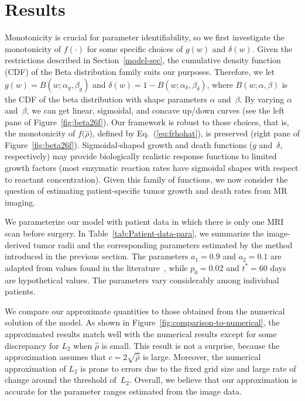 \documentclass{aims}
\numberwithin{equation}{section}
\begin{document}
\section{Results}

Monotonicity is crucial for parameter identifiability, so we
first investigate the monotonicity of $f(\cdot)$ for some specific
choices of $g(w)$ and $\delta(w)$.
Given the restrictions described in Section~\ref{model-sec},
the cumulative density function (CDF) of the Beta distribution family
suits our purposes.  Therefore, we let $g(w)=B(w;\alpha_g,\beta_g)$ and
$\delta(w)=1-B(w;\alpha_{\delta},\beta_{\delta})$, where 
$B(w; \alpha, \beta)$ is the CDF of the beta distribution with shape
parameters $\alpha$ and~$\beta$. By varying $\alpha$ and~$\beta$, we can
get linear, sigmoidal, and concave
up/down curves (see the left pane of Figure~\ref{fig:beta26f}).
Our framework is robust to those choices, that is, the
monotonicity of $f(\hat\rho$), defined by Eq.~(\ref{eq:frhohat}),
is preserved (right pane of Figure~\ref{fig:beta26f}). 
Sigmoidal-shaped growth and death functions ($g$ and~$\delta$, respectively)
may provide biologically realistic response functions to limited growth factors
(most enzymatic reaction rates have sigmoidal
shapes with respect to reactant concentration).  Given this family of
functions, we now consider the question of estimating patient-specific tumor
growth and death rates from MR imaging.

We parameterize our model with patient data in which there is only
one MRI scan before surgery. In Table~\ref{tab:Patient-data-para},
we summarize the image-derived tumor radii and the corresponding parameters
estimated by the method introduced in the previous section.
The parameters $a_1=0.9$ and $a_2=0.1$ are adapted from values found in the
literature~\cite{Swanson2008}, while $p_0=0.02$  and $t^*=60$ days
are hypothetical values.  The parameters vary considerably
among individual patients. 

We compare our approximate quantities to those obtained from the numerical
solution of the model.  As shown in Figure~\ref{fig:comparison-to-numerical},
the approximated results match well with the numerical results except
for some discrepancy for $L_{2}$ when $\hat{\rho}$ is small.  This result
is not a surprise, because the approximation assumes that
$c=2\sqrt{\hat{\rho}}$ is large.  Moreover, the numerical approximation
of $L_{2}$ is prone to errors due to the fixed grid size and large
rate of change around the threshold of~$L_{2}$. Overall, we believe
that our approximation is accurate for the parameter ranges estimated
from the image data.
\end{document}

